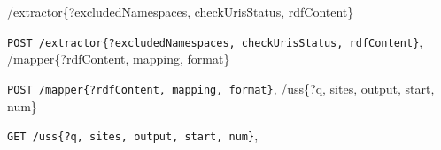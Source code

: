 \documentclass[letterpaper,10pt,english]{sphinxmanual}
\begin{document}
\renewcommand{\indexname}{HTTP Routing Table}
\begin{theindex}
\def\bigletter#1{{\Large\sffamily#1}\nopagebreak\vspace{1mm}}
\bigletter{/extractor\{?excludedNamespaces, checkUrisStatus, rdfContent\}}
\item {\texttt{POST /extractor\{?excludedNamespaces, checkUrisStatus, rdfContent\}}}, \pageref{docs/extractor:post--extractor_?excludedNamespaces, checkUrisStatus, rdfContent_}
\indexspace
\bigletter{/mapper\{?rdfContent, mapping, format\}}
\item {\texttt{POST /mapper\{?rdfContent, mapping, format\}}}, \pageref{docs/mapper:post--mapper_?rdfContent, mapping, format_}
\indexspace
\bigletter{/uss\{?q, sites, output, start, num\}}
\item {\texttt{GET /uss\{?q, sites, output, start, num\}}}, \pageref{docs/uss:get--uss_?q, sites, output, start, num_}
\end{theindex}

\renewcommand{\indexname}{Index}
\printindex
\end{document}
